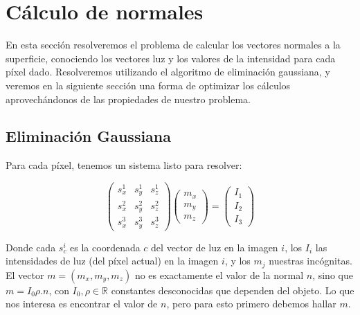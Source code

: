 


\section{Cálculo de normales}

En esta sección resolveremos el problema de calcular los vectores normales a la superficie, conociendo los vectores luz y los valores de la intensidad para cada píxel dado. Resolveremos utilizando el algoritmo de eliminación gaussiana, y veremos en la siguiente sección una forma de optimizar los cálculos aprovechándonos de las propiedades de nuestro problema.

\subsection{Eliminación Gaussiana}

Para cada píxel, tenemos un sistema listo para resolver:

\[
\begin{pmatrix}
    s_{x}^{1} & s_{y}^{1} & s_{z}^{1} \\
    s_{x}^{2} & s_{y}^{2} & s_{z}^{2} \\
    s_{x}^{3} & s_{y}^{3} & s_{z}^{3}
\end{pmatrix}
\begin{pmatrix}
    m_{x} \\
    m_{y} \\
    m_{z}
\end{pmatrix}
=
\begin{pmatrix}
    I_{1} \\
    I_{2} \\
    I_{3}
\end{pmatrix}
\]

Donde cada $s_{c}^{i}$ es la coordenada $c$ del vector de luz en la imagen $i$, los $I_i$ las intensidades de luz (del píxel actual) en la imagen $i$, y los $m_j$ nuestras incógnitas. El vector $m = (m_x, m_y, m_z)$ no es exactamente el valor de la normal $n$, sino que $m = I_0 \rho . n$, con $I_0, \rho \in \mathbb{R}$ constantes desconocidas que dependen del objeto. Lo que nos interesa es encontrar el valor de $n$, pero para esto primero debemos hallar $m$. \\

